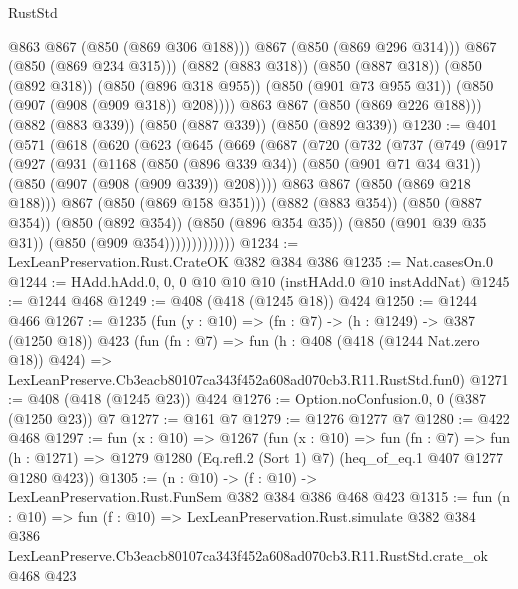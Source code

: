 \begin{lexlean}{RustStd}
\begin{coremodule}
                @863
                @867
                (@850 (@869 @306 @188)))
              @867
              (@850 (@869 @296 @314)))
            @867
            (@850 (@869 @234 @315)))
          (@882 (@883 @318))
          (@850 (@887 @318))
          (@850 (@892 @318))
          (@850 (@896 @318 @955))
          (@850 (@901 @73 @955 @31))
          (@850 (@907 (@908 (@909 @318)) @208))))
      @863
      @867
      (@850 (@869 @226 @188)))
    (@882 (@883 @339))
    (@850 (@887 @339))
    (@850 (@892 @339))
@1230 := @401
    (@571
      (@618
        (@620
          (@623
            (@645
              (@669
                (@687
                  (@720
                    (@732
                      (@737
                        (@749
                          (@917
                            (@927
                              (@931
                                (@1168
                                  (@850 (@896 @339 @34))
                                  (@850 (@901 @71 @34 @31))
                                  (@850 (@907 (@908 (@909 @339)) @208))))
                              @863
                              @867
                              (@850 (@869 @218 @188)))
                            @867
                            (@850 (@869 @158 @351)))
                          (@882 (@883 @354))
                          (@850 (@887 @354))
                          (@850 (@892 @354))
                          (@850 (@896 @354 @35))
                          (@850 (@901 @39 @35 @31))
                          (@850 (@909 @354)))))))))))))
@1234 := LexLeanPreservation.Rust.CrateOK @382 @384 @386
@1235 := Nat.casesOn.{0}
@1244 := HAdd.hAdd.{0, 0, 0} @10 @10 @10 (instHAdd.{0} @10 instAddNat)
@1245 := @1244 @468
@1249 := @408 (@418 (@1245 @18)) @424
@1250 := @1244 @466
@1267 := @1235
    (fun (y : @10) => (fn : @7) -> (h : @1249) -> @387 (@1250 @18))
    @423
    (fun (fn : @7) =>
    fun (h : @408 (@418 (@1244 Nat.zero @18)) @424) =>
    LexLeanPreserve.Cb3eacb80107ca343f452a608ad070cb3.R11.RustStd.fun0)
@1271 := @408 (@418 (@1245 @23)) @424
@1276 := Option.noConfusion.{0, 0} (@387 (@1250 @23)) @7
@1277 := @161 @7
@1279 := @1276 @1277 @7
@1280 := @422 @468
@1297 := fun (x : @10) =>
  @1267
    (fun (x : @10) =>
    fun (fn : @7) =>
    fun (h : @1271) => @1279 @1280 (Eq.refl.{2} (Sort 1) @7) (heq_of_eq.{1} @407 @1277 @1280 @423))
@1305 := (n : @10) -> (f : @10) -> LexLeanPreservation.Rust.FunSem @382 @384 @386 @468 @423
@1315 := fun (n : @10) =>
  fun (f : @10) =>
  LexLeanPreservation.Rust.simulate
    @382
    @384
    @386
    LexLeanPreserve.Cb3eacb80107ca343f452a608ad070cb3.R11.RustStd.crate_ok
    @468
    @423
\end{coremodule}
\end{lexlean}
